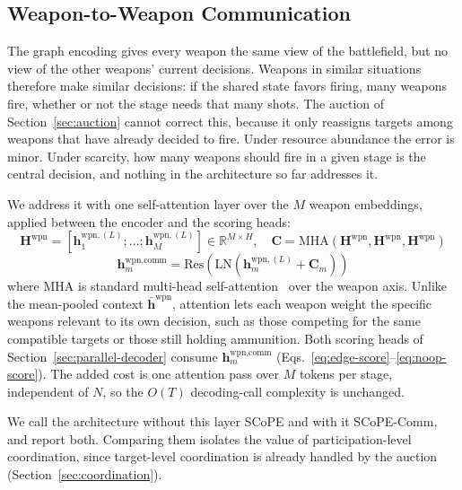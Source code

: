 \subsection{Weapon-to-Weapon Communication}
\label{sec:comm}

The graph encoding gives every weapon the same view of the battlefield, but no view of the other weapons' current decisions. Weapons in similar situations therefore make similar decisions: if the shared state favors firing, many weapons fire, whether or not the stage needs that many shots. The auction of Section~\ref{sec:auction} cannot correct this, because it only reassigns targets among weapons that have already decided to fire. Under resource abundance the error is minor. Under scarcity, how many weapons should fire in a given stage is the central decision, and nothing in the architecture so far addresses it.

We address it with one self-attention layer over the $M$ weapon embeddings, applied between the encoder and the scoring heads:
\begin{equation}
\label{eq:comm-attn}
\bm{H}^{\text{wpn}} = \left[\bm{h}_1^{\text{wpn},(L)}; \ldots; \bm{h}_M^{\text{wpn},(L)}\right] \in \mathbb{R}^{M\times H}, \quad
\bm{C} = \text{MHA}\!\left(\bm{H}^{\text{wpn}}, \bm{H}^{\text{wpn}}, \bm{H}^{\text{wpn}}\right)
\end{equation}
\begin{equation}
\label{eq:comm-out}
\bm{h}_m^{\text{wpn,comm}} = \text{Res}\!\left(\text{LN}\!\left(\bm{h}_m^{\text{wpn},(L)} + \bm{C}_m\right)\right)
\end{equation}
where $\text{MHA}$ is standard multi-head self-attention~\cite{vaswani2017attention} over the weapon axis. Unlike the mean-pooled context $\bar{\bm{h}}^{\text{wpn}}$, attention lets each weapon weight the specific weapons relevant to its own decision, such as those competing for the same compatible targets or those still holding ammunition. Both scoring heads of Section~\ref{sec:parallel-decoder} consume $\bm{h}_m^{\text{wpn,comm}}$ (Eqs.~\eqref{eq:edge-score}--\eqref{eq:noop-score}). The added cost is one attention pass over $M$ tokens per stage, independent of $N$, so the $O(T)$ decoding-call complexity is unchanged.

We call the architecture without this layer SCoPE and with it SCoPE-Comm, and report both. Comparing them isolates the value of participation-level coordination, since target-level coordination is already handled by the auction (Section~\ref{sec:coordination}).

